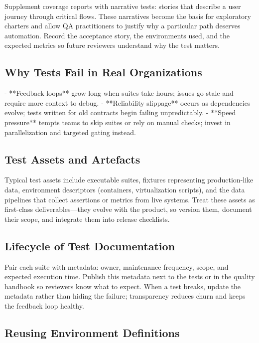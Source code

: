 Supplement coverage reports with narrative tests: stories that describe a user journey through critical flows. These narratives become the basis for exploratory charters and allow QA practitioners to justify why a particular path deserves automation. Record the acceptance story, the environments used, and the expected metrics so future reviewers understand why the test matters.

\subsection{Why Tests Fail in Real Organizations}

- **Feedback loops** grow long when suites take hours; issues go stale and require more context to debug.
- **Reliability slippage** occurs as dependencies evolve; tests written for old contracts begin failing unpredictably.
- **Speed pressure** tempts teams to skip suites or rely on manual checks; invest in parallelization and targeted gating instead.

\subsection{Test Assets and Artefacts}

Typical test assets include executable suites, fixtures representing production-like data, environment descriptors (containers, virtualization scripts), and the data pipelines that collect assertions or metrics from live systems. Treat these assets as first-class deliverables—they evolve with the product, so version them, document their scope, and integrate them into release checklists.

\subsection{Lifecycle of Test Documentation}

Pair each suite with metadata: owner, maintenance frequency, scope, and expected execution time. Publish this metadata next to the tests or in the quality handbook so reviewers know what to expect. When a test breaks, update the metadata rather than hiding the failure; transparency reduces churn and keeps the feedback loop healthy.

\subsection{Reusing Environment Definitions}

